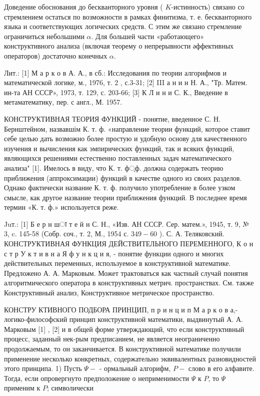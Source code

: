 \documentclass[10pt]{article}
\begin{document}
Доведение обоснования до бескванторного уровня ( $K$-истинность) связано со стремлением остаться по возможности в рамках финитизма, т. е. бескванторного языка и соответствующих логических средств. С этим же связано стремление ограничиться небольшими $\alpha$. Для большей части «работающего» конструктивного анализа (включая теорему о непрерывности әффективных операторов) достаточно конечных $\alpha$.



Лит.: [1] М а р к о в А. А., в сб.: Исследования по теории алгорифмов и математической логике, м., 1976, т. 2 , с.3-31; [2] III а н и н Н. А., "Тр. Матем. ин-та АН СССР», 1973, т. 129, с. 203-66; [3] К Л и н и С. К., Введение в метаматематику, пер. с англ., М. 1957.



КОНСТРУКТИВНАЯ ТЕОРИЯ ФУНКЦИЙ - понятие, введенное С. Н. Бернштейном, назвавшім К. т. ф. «направление теории функций, которое ставит себе целью дать возможно более простую и удобную основу для качественного изучения и вычисления как эмпирических функций, так и всяких функций, являющихся решениями естественно поставленных задач математического анализа" [1]. Имелось в виду, что К. т. ф्ф. должна содержать теорию приближения (аппроксимации) функций в качестве одного из своих разделов. Однако фактически название К. т. ф. получило употребление в более узком смысле, как другое название теории приближения функций. В последнее время термин «К. т. ф.» используется реже.



Juт.: [1] Б е р н шा т е й н С. Н., «Изв. АН СССР. Сер. матем.», 1945, т. 9, № 3, c. 145-58 (Собр. соч., т. 2, М., 1954 с. $349-60$ ). С. А. Теляковский. КОНСТРУКТИВНАЯ ФУНКЦИЯ ДЕЙСТВИТЕЛЬНОГО ПЕРЕМЕННОГО, К о н с т р У к т и в н а Я ф у н к ц и я, - понятие функции одного и многих действительных переменных, используемое в конструктивной математике. Предложено А. А. Марковым. Может трактоваться как частный случай понятия алгоритмического оператора в конструктивных метрич. пространствах. См. также Конструктивный анализ, Конструктивное метрическое пространство.



КОНСТРУ КТИВНОГО ПОДБОРА ПРИНЦИП, п р и н ц и п М а р к о в а,- логико-философский принцип конструктивной математики, выдвинутый А. А. Марковым [1] , [2] и в общей форме утверждающий, что если конструктивный процесс, заданный нек-рым предписанием, не является неограниченно продолжаемым, то он заканчивается. В конструктивной математике получили применение несколько конкретных, содержательно эквивалентных разновидностей этого принципа. 1) Пусть $\Psi-$ - ормальный алгорифм, $P-$ слово в его алфавите. Тогда, если опровергнуто предположение о неприменимости $\Psi$ к $P$, то $\Psi$ применим к $P$; символически
\end{document}
